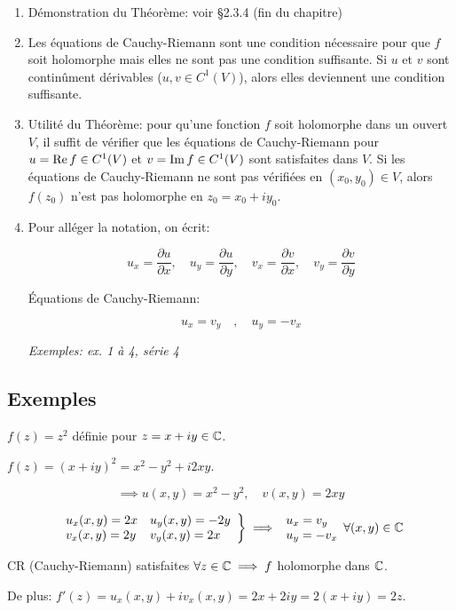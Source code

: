 \begin{remark}\hfill
\begin{enumerate}[label=\arabic{enumi})]
    \item 
    Démonstration du Théorème: voir §2.3.4 (fin du chapitre)
    \item 
    Les équations de Cauchy-Riemann sont une condition nécessaire pour que $f$ soit holomorphe mais elles ne sont pas une condition suffisante.
    Si $u$ et $v$ sont continûment dérivables ($u,v \in C^1(V)$), alors elles deviennent une condition suffisante.
    \item 
    Utilité du Théorème: pour qu'une fonction $f$ soit holomorphe dans un ouvert $V$, il suffit de vérifier que les équations de Cauchy-Riemann pour $u = \operatorname{Re} f \in C^1(V)$ et $v = \operatorname{Im} f \in C^1(V)$ sont satisfaites dans $V$.
    Si les équations de Cauchy-Riemann ne sont pas vérifiées en $(x_0,y_0) \in V$, alors $f(z_0)$ n'est pas holomorphe en $z_0 = x_0 + iy_0$.
    \item 
    Pour alléger la notation, on écrit:
    
    \[
    u_x = \frac{\partial u}{\partial x}, \quad
    u_y = \frac{\partial u}{\partial y}, \quad
    v_x = \frac{\partial v}{\partial x}, \quad
    v_y = \frac{\partial v}{\partial y}
    \]
    
    Équations de Cauchy-Riemann:
    
    \[
    u_x = v_y \quad, \quad u_y = -v_x
    \]
    
    \textit{Exemples: ex. 1 à 4, série 4}
\end{enumerate}
\end{remark}

\subsection{Exemples}

\begin{example}[1]\hfill
    
    $f(z) = z^2$ définie pour $z = x + iy \in \mathbb{C}$.
    
    $f(z) = (x + iy) ^2 = x^2 - y^2 + i2xy$.
    
    \[\implies u(x,y) = x^2 - y^2, \quad v(x,y) = 2xy\]
    
    \[\left.
    \begin{array}{ll}
    u_x(x,y) = 2x &
    u_y(x,y) = -2y \\
    v_x(x,y) = 2y &
    v_y(x,y) = 2x
    \end{array}
    \right\} \implies
    \begin{array}{l}
    u_x = v_y \\
    u_y = -v_x
    \end{array}
    \forall (x,y) \in \mathbb{C}\]
    
    CR (Cauchy-Riemann) satisfaites $\forall z \in \mathbb{C} \implies f$ holomorphe dans $\mathbb{C}$.
    
    De plus: $f'(z) = u_x(x,y) + i v_x(x,y) = 2x + 2iy = 2(x + iy) = 2z$.
\end{example}

